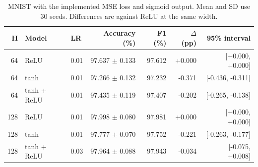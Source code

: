 \begin{table}[htbp]
\centering
\caption{MNIST with the implemented MSE loss and sigmoid output. Mean and SD use 30 seeds. Differences are against ReLU at the same width.}
\label{tab:mse}
\footnotesize
\begin{tabular}{@{}rllrrrr@{}}
\toprule
H & Model & LR & Accuracy (\%) & F1 (\%) & $\Delta$ (pp) & 95\% interval \\
\midrule
64 & ReLU & 0.01 & 97.637 $\pm$ 0.133 & 97.612 & +0.000 & [+0.000, +0.000] \\
64 & tanh & 0.01 & 97.266 $\pm$ 0.132 & 97.232 & -0.371 & [-0.436, -0.311] \\
64 & tanh + ReLU & 0.01 & 97.435 $\pm$ 0.119 & 97.407 & -0.202 & [-0.265, -0.138] \\
128 & ReLU & 0.01 & 97.998 $\pm$ 0.080 & 97.981 & +0.000 & [+0.000, +0.000] \\
128 & tanh & 0.01 & 97.777 $\pm$ 0.070 & 97.752 & -0.221 & [-0.263, -0.177] \\
128 & tanh + ReLU & 0.03 & 97.964 $\pm$ 0.088 & 97.943 & -0.034 & [-0.075, +0.008] \\
\bottomrule
\end{tabular}
\end{table}
